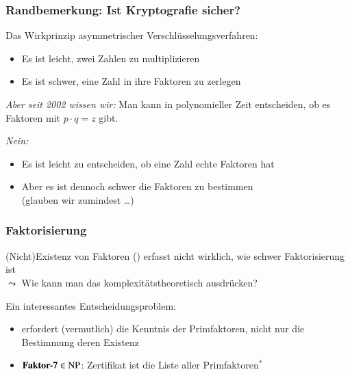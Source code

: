 \documentclass[onlymath]{beamer}
\begin{document}
\begin{frame}\frametitle{Randbemerkung: Ist Kryptografie sicher?}

Das Wirkprinzip asymmetrischer Verschlüsselungsverfahren:
\begin{itemize}
\item Es ist \alert{leicht}, zwei Zahlen zu multiplizieren
\item Es ist \alert{schwer}, eine Zahl in ihre Faktoren zu zerlegen
\end{itemize}\medskip
\emph{Aber seit 2002 wissen wir:} Man kann in polynomieller Zeit entscheiden, ob es
Faktoren mit $p\cdot q=z$ gibt.\bigskip

\pause\bigskip

\emph{Nein:}
\begin{itemize}
\item Es ist \alert{leicht} zu entscheiden, ob eine Zahl echte Faktoren hat
\item Aber es ist dennoch \alert{schwer} die Faktoren zu bestimmen\\
(glauben wir zumindest \ldots)
\end{itemize}

\end{frame}

\begin{frame}\frametitle{Faktorisierung}

(Nicht)Existenz von Faktoren () erfasst nicht wirklich,
wie schwer Faktorisierung ist\\
$\leadsto$ Wie kann man das komplexitätstheoretisch ausdrücken?
\medskip\pause

\pause

Ein interessantes Entscheidungsproblem:
\begin{itemize}
\item {} erfordert (vermutlich) die Kenntnis der Primfaktoren, nicht nur
die Bestimmung deren Existenz\pause
\item $\textbf{\textcolor{black}{Faktor-7}}\in{\textsc{NP}}$\pause: Zertifikat ist die Liste aller Primfaktoren${}^*$
\end{itemize}


\end{frame}
\end{document}
